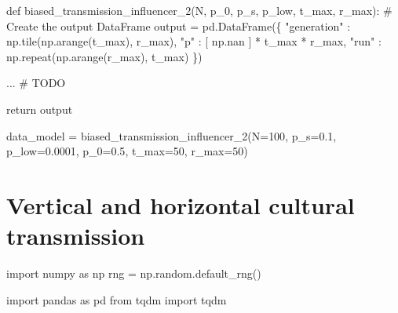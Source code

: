 \documentclass[
  a4paperpaper,
  ,captions=tableheading
]{scrbook}
\newenvironment{Shaded}{\begin{snugshade}}{\end{snugshade}}
\newcommand{\AlertTok}[1]{\textcolor[rgb]{0.68,0.00,0.00}{#1}}
\newcommand{\CommentTok}[1]{\textcolor[rgb]{0.37,0.37,0.37}{#1}}
\newcommand{\ControlFlowTok}[1]{\textcolor[rgb]{0.00,0.23,0.31}{#1}}
\newcommand{\DecValTok}[1]{\textcolor[rgb]{0.68,0.00,0.00}{#1}}
\newcommand{\FloatTok}[1]{\textcolor[rgb]{0.68,0.00,0.00}{#1}}
\newcommand{\ImportTok}[1]{\textcolor[rgb]{0.00,0.46,0.62}{#1}}
\newcommand{\KeywordTok}[1]{\textcolor[rgb]{0.00,0.23,0.31}{#1}}
\newcommand{\NormalTok}[1]{\textcolor[rgb]{0.00,0.23,0.31}{#1}}
\newcommand{\OperatorTok}[1]{\textcolor[rgb]{0.37,0.37,0.37}{#1}}
\newcommand{\StringTok}[1]{\textcolor[rgb]{0.13,0.47,0.30}{#1}}
\begin{document}
\begin{Shaded}
\begin{Highlighting}[]
\KeywordTok{def}\NormalTok{ biased\_transmission\_influencer\_2(N, p\_0, p\_s, p\_low, t\_max, r\_max):}
    \CommentTok{\# Create the output DataFrame}
\NormalTok{    output }\OperatorTok{=}\NormalTok{ pd.DataFrame(\{}
        \StringTok{"generation"}\NormalTok{ : np.tile(np.arange(t\_max), r\_max),}
        \StringTok{"p"}\NormalTok{ : [ np.nan ] }\OperatorTok{*}\NormalTok{ t\_max }\OperatorTok{*}\NormalTok{ r\_max,}
        \StringTok{"run"}\NormalTok{ : np.repeat(np.arange(r\_max), t\_max)}
\NormalTok{    \})}
    
\NormalTok{    ... }\CommentTok{\# }\AlertTok{TODO}
    
    \ControlFlowTok{return}\NormalTok{ output}
\end{Highlighting}
\end{Shaded}

\begin{Shaded}
\begin{Highlighting}[]
\NormalTok{data\_model }\OperatorTok{=}\NormalTok{ biased\_transmission\_influencer\_2(N}\OperatorTok{=}\DecValTok{100}\NormalTok{, p\_s}\OperatorTok{=}\FloatTok{0.1}\NormalTok{, p\_low}\OperatorTok{=}\FloatTok{0.0001}\NormalTok{, p\_0}\OperatorTok{=}\FloatTok{0.5}\NormalTok{, t\_max}\OperatorTok{=}\DecValTok{50}\NormalTok{, r\_max}\OperatorTok{=}\DecValTok{50}\NormalTok{)}
\end{Highlighting}
\end{Shaded}

\hypertarget{sec-vertical-horizontal}{%
\chapter{Vertical and horizontal cultural
transmission}\label{sec-vertical-horizontal}}

\begin{Shaded}
\begin{Highlighting}[]
\ImportTok{import}\NormalTok{ numpy }\ImportTok{as}\NormalTok{ np }
\NormalTok{rng }\OperatorTok{=}\NormalTok{ np.random.default\_rng()}

\ImportTok{import}\NormalTok{ pandas }\ImportTok{as}\NormalTok{ pd}
\ImportTok{from}\NormalTok{ tqdm }\ImportTok{import}\NormalTok{ tqdm}
\end{Highlighting}
\end{Shaded}
\end{document}
